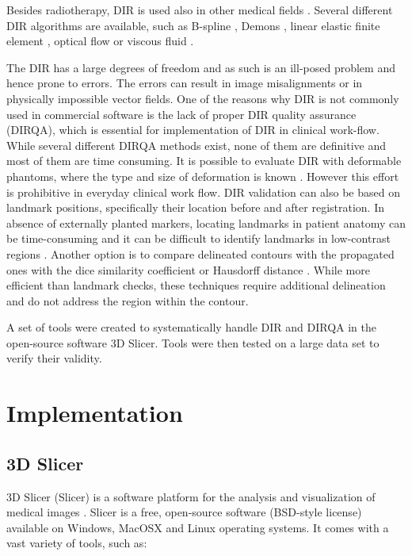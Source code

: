 \documentclass[type=dr, dr=rernat, accentcolor=tud7b,colorbacktitle, bigchapter, openright, twoside, 12pt ]{tudthesis}
\begin{document}
Besides radiotherapy, DIR is used also in other medical fields \cite{Cleary2010, Herrell2012, Nithiananthan2011, Naini2010}.
Several different DIR algorithms are available, such as B-spline \cite{Rueckert1999}, Demons \cite{Thirion1998}, linear elastic finite element \cite{Venugopal2005}, optical flow \cite{Zhong2007} or viscous fluid \cite{Christensen1996}.
	
The DIR has a large degrees of freedom and as such is an ill-posed problem and hence prone to errors. The errors can result in image misalignments or in physically impossible vector fields. 
One of the reasons why DIR is not commonly used in commercial software is the lack of proper DIR quality assurance (DIRQA), which is essential for implementation of DIR in clinical work-flow. While several different DIRQA methods exist, none of them are definitive and most of them are time consuming. 
It is possible to evaluate DIR with deformable phantoms, where the type and size of deformation is known \cite{Kashani2007, Kirby2011}. However this effort is prohibitive 
in everyday clinical work flow. DIR validation can also be based on landmark positions, specifically their location before and after registration. In absence of externally planted markers, locating landmarks in patient 
anatomy can be time-consuming and it can be difficult to identify landmarks in low-contrast regions \cite{Varadhan2013}. Another option is to compare delineated contours with the propagated ones with the dice similarity coefficient \cite{Varadhan2013} or Hausdorff distance \cite{Huttenlocher1993}. 
While more efficient than landmark checks, these techniques require additional delineation and do not address the region within the contour.

A set of tools were created to systematically handle DIR and DIRQA in the open-source software 3D Slicer. Tools were then tested on a large data set to verify their validity.

\section{Implementation}
\label{Implementation}

\subsection{3D Slicer}
\label{Slicer}

3D Slicer (Slicer) is a software platform for the analysis and visualization of medical images \cite{Slicer, Fedorov2012}. Slicer is a free, open-source software (BSD-style license) available on Windows, MacOSX and Linux operating systems. 
It comes with a vast variety of tools, such as:
\end{document}
